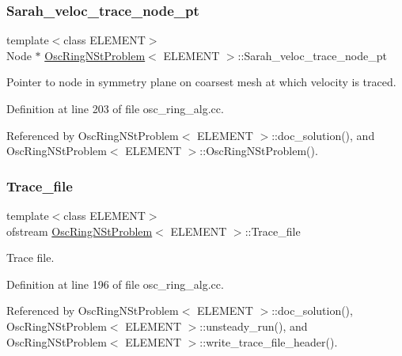 \subsubsection{\texorpdfstring{Sarah\+\_\+veloc\+\_\+trace\+\_\+node\+\_\+pt}{Sarah\_veloc\_trace\_node\_pt}}
{\footnotesize\ttfamily template$<$class E\+L\+E\+M\+E\+NT$>$ \\
Node $\ast$ \hyperlink{classOscRingNStProblem}{Osc\+Ring\+N\+St\+Problem}$<$ E\+L\+E\+M\+E\+NT $>$\+::Sarah\+\_\+veloc\+\_\+trace\+\_\+node\+\_\+pt\hspace{0.3cm}{\ttfamily [private]}}



Pointer to node in symmetry plane on coarsest mesh at which velocity is traced. 



Definition at line 203 of file osc\+\_\+ring\+\_\+alg.\+cc.



Referenced by Osc\+Ring\+N\+St\+Problem$<$ E\+L\+E\+M\+E\+N\+T $>$\+::doc\+\_\+solution(), and Osc\+Ring\+N\+St\+Problem$<$ E\+L\+E\+M\+E\+N\+T $>$\+::\+Osc\+Ring\+N\+St\+Problem().

\mbox{\label{classOscRingNStProblem_a37c1af48245859045bed1c3fc36be3da}} 
\subsubsection{\texorpdfstring{Trace\+\_\+file}{Trace\_file}}
{\footnotesize\ttfamily template$<$class E\+L\+E\+M\+E\+NT$>$ \\
ofstream \hyperlink{classOscRingNStProblem}{Osc\+Ring\+N\+St\+Problem}$<$ E\+L\+E\+M\+E\+NT $>$\+::Trace\+\_\+file\hspace{0.3cm}{\ttfamily [private]}}



Trace file. 



Definition at line 196 of file osc\+\_\+ring\+\_\+alg.\+cc.



Referenced by Osc\+Ring\+N\+St\+Problem$<$ E\+L\+E\+M\+E\+N\+T $>$\+::doc\+\_\+solution(), Osc\+Ring\+N\+St\+Problem$<$ E\+L\+E\+M\+E\+N\+T $>$\+::unsteady\+\_\+run(), and Osc\+Ring\+N\+St\+Problem$<$ E\+L\+E\+M\+E\+N\+T $>$\+::write\+\_\+trace\+\_\+file\+\_\+header().

